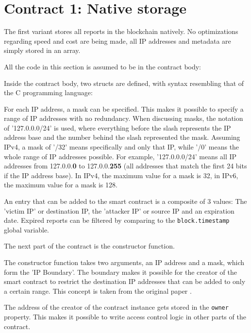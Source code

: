 \section{Contract 1: Native storage}
The first variant stores all reports in the blockchain natively. No optimizations regarding speed and cost are being made, all IP addresses and metadata are simply stored in an array.

All the code in this section is assumed to be in the contract body:


Inside the contract body, two structs are defined, with syntax resembling that of the C programming language:



For each IP address, a mask can be specified. This makes it possible to specify a range of IP addresses with no redundancy. 
When discussing masks, the notation of '127.0.0.0/24' is used, where everything before the slash represents the IP address base and the number behind the slash represented the mask. Assuming IPv4, a mask of '/32' means specifically and only that IP, while '/0' means the whole range of IP addresses possible. For example, '127.0.0.0/24' means all IP addresses from 127.0.0.\textbf{0} to 127.0.0.\textbf{255} (all addresses that match the first 24 bits if the IP address base). In IPv4, the maximum value for a mask is 32, in IPv6, the maximum value for a mask is 128.

An entry that can be added to the smart contract is a composite of 3 values: The 'victim IP' or destination IP, the 'attacker IP' or source IP and an expiration date. Expired reports can be filtered by comparing to the \texttt{block.timestamp} global variable.

\clearpage

The next part of the contract is the constructor function.



The constructor function takes two arguments, an IP address and a mask, which form the 'IP Boundary'. The boundary makes it possible for the creator of the smart contract to restrict the destination IP addresses that can be added to only a certain range. This concept is taken from the original paper \cite{OriginalPaper}.

The address of the creator of the contract instance gets stored in the \texttt{owner} property. This makes it possible to write access control logic in other parts of the contract.

